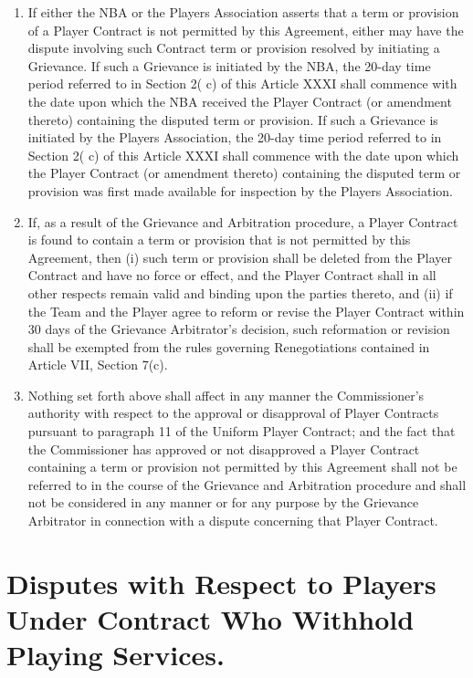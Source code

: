 \documentclass[
]{book}
\providecommand{\tightlist}{%
  \setlength{\itemsep}{0pt}\setlength{\parskip}{0pt}}
\begin{document}
\begin{enumerate}
\def\labelenumi{(\alph{enumi})}
\tightlist
\item
  If either the NBA or the Players Association asserts that a term or provision of a Player Contract is not permitted by this Agreement, either may have the dispute involving such Contract term or provision resolved by initiating a Grievance. If such a Grievance is initiated by the NBA, the 20-day time period referred to in Section 2( c) of this Article XXXI shall commence with the date upon which the NBA received the Player Contract (or amendment thereto) containing the disputed term or provision. If such a Grievance is initiated by the Players Association, the 20-day time period referred to in Section 2( c) of this Article XXXI shall commence with the date upon which the Player Contract (or amendment thereto) containing the disputed term or provision was first made available for inspection by the Players Association.
\item
  If, as a result of the Grievance and Arbitration procedure, a Player Contract is found to contain a term or provision that is not permitted by this Agreement, then (i) such term or provision shall be deleted from the Player Contract and have no force or effect, and the Player Contract shall in all other respects remain valid and binding upon the parties thereto, and (ii) if the Team and the Player agree to reform or revise the Player Contract within 30 days of the Grievance Arbitrator's decision, such reformation or revision shall be exempted from the rules governing Renegotiations contained in Article VII, Section 7(c).
\item
  Nothing set forth above shall affect in any manner the Commissioner's authority with respect to the approval or disapproval of Player Contracts pursuant to paragraph 11 of the Uniform Player Contract; and the fact that the Commissioner has approved or not disapproved a Player Contract containing a term or provision not permitted by this Agreement shall not be referred to in the course of the Grievance and Arbitration procedure and shall not be considered in any manner or for any purpose by the Grievance Arbitrator in connection with a dispute concerning that Player Contract.
\end{enumerate}

\hypertarget{disputes-with-respect-to-players-under-contract-who-withhold-playing-services.}{%
\section{Disputes with Respect to Players Under Contract Who Withhold Playing Services.}\label{disputes-with-respect-to-players-under-contract-who-withhold-playing-services.}}
\end{document}
